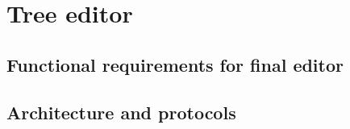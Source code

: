 \section{Tree editor}

\subsection{Functional requirements for final editor}




\subsection{Architecture and protocols}
